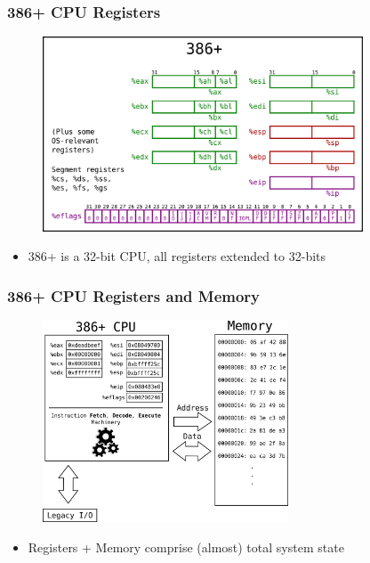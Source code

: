 \documentclass[11pt,xcolor=dvipsnames]{beamer}
\begin{document}
\begin{frame}[fragile,t]
\frametitle{386+ CPU Registers}
\begin{figure}
\centering \includegraphics[width=0.85\textwidth]{figures/386state.png}
\end{figure}
\begin{itemize}
    \item 386+ is a 32-bit CPU, all registers extended to 32-bits
\end{itemize}
\end{frame}

\begin{frame}[fragile,t]
\frametitle{386+ CPU Registers and Memory}
\begin{figure}
\centering \includegraphics[width=0.65\textwidth]{figures/386statemem.png}
\end{figure}
\begin{itemize}
    \item Registers + Memory comprise (almost) total system state
\end{itemize}
\end{frame}
\end{document}

